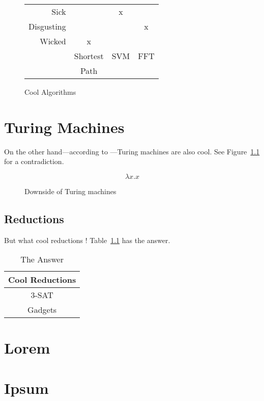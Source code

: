 \documentclass[doublespace]{rackham-thesis}
\begin{document}
\begin{figure}[h]
    \centering
    \begin{tabular}{r|ccc}
        Sick & & x \\
        Disgusting & & & x \\
        Wicked & x \\ \hline
        & Shortest & SVM & FFT \\
        & Path \\
    \end{tabular}
    \caption{Cool Algorithms}
    \label{fig:alg}
\end{figure}


\chapter{Turing Machines}

On the other hand---according to \textcite{turing}---Turing machines are also cool.
See Figure~\ref{fig:comp} for a contradiction.
\lipsum[4]

\begin{figure}
    \centering
    {
        \Huge
        \begin{equation*}
            \lambda x . x
        \end{equation*}
    }
    \caption{Downside of Turing machines}
    \label{fig:comp}
\end{figure}


\section{Reductions}

But what cool reductions \parencite{cook}!
Table~\ref{tab:red} has the answer.
\lipsum[5-7]

\begin{table}
    \centering
    \caption{The Answer}
    \begin{tabular}{c} \toprule
        Cool Reductions \\ \midrule
        3-SAT \\
        Gadgets \\ \bottomrule
    \end{tabular}
    \label{tab:red}
\end{table}

\appendix

\chapter{Lorem}
\lipsum[8-13]

\chapter{Ipsum}
\lipsum[14]

\printbibliography
\end{document}
